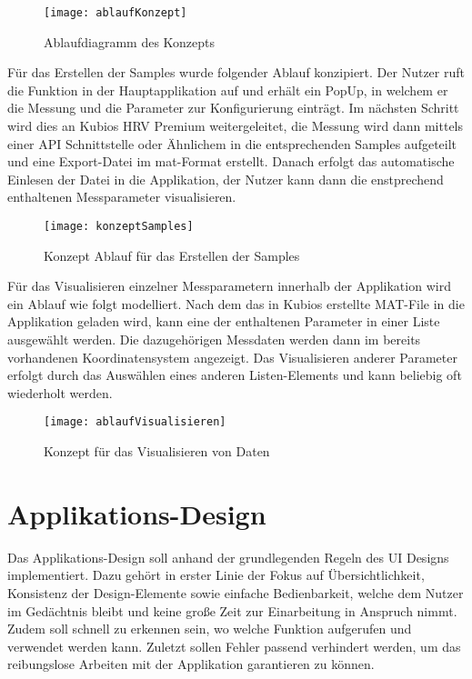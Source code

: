 \begin{figure}[H]
	\centering
	\texttt{[image: ablaufKonzept]}
	\caption{Ablaufdiagramm des Konzepts}
	\label{fig:ablaufKonzept}
\end{figure}

Für das Erstellen der Samples wurde folgender Ablauf konzipiert. Der Nutzer ruft die Funktion in der Hauptapplikation auf und erhält ein PopUp, in welchem er die Messung und die Parameter zur Konfigurierung einträgt. Im nächsten Schritt wird dies an Kubios HRV Premium weitergeleitet, die Messung  wird dann mittels einer API Schnittstelle oder Ähnlichem in die entsprechenden Samples aufgeteilt und eine Export-Datei im mat-Format erstellt. Danach erfolgt das automatische Einlesen der Datei in die Applikation, der Nutzer kann dann die enstprechend enthaltenen Messparameter visualisieren.

\begin{figure}[H]
	\centering
	\texttt{[image: konzeptSamples]}
	\caption{Konzept Ablauf für das Erstellen der Samples}
	\label{fig:konzeptSamples}
\end{figure}

Für das Visualisieren einzelner Messparametern innerhalb der Applikation wird ein Ablauf wie folgt modelliert. Nach dem das in Kubios erstellte MAT-File in die Applikation geladen wird, kann eine der enthaltenen Parameter in einer Liste ausgewählt werden. Die dazugehörigen Messdaten werden dann im bereits vorhandenen Koordinatensystem angezeigt. Das Visualisieren anderer Parameter erfolgt durch das Auswählen eines anderen Listen-Elements und kann beliebig oft wiederholt werden. 

\begin{figure}[H]
	\centering
	\texttt{[image: ablaufVisualisieren]}
	\caption{Konzept für das Visualisieren von Daten}
	\label{fig:ablaufVisualisieren}
\end{figure}

\section{Applikations-Design}

Das Applikations-Design soll anhand der grundlegenden Regeln des UI Designs implementiert. Dazu gehört in erster Linie der Fokus auf Übersichtlichkeit, Konsistenz der Design-Elemente sowie einfache Bedienbarkeit, welche dem Nutzer im Gedächtnis bleibt und keine große Zeit zur Einarbeitung in Anspruch nimmt. Zudem soll schnell zu erkennen sein, wo welche Funktion aufgerufen und verwendet werden kann. Zuletzt sollen Fehler passend verhindert werden, um das reibungslose Arbeiten mit der Applikation garantieren zu können.

